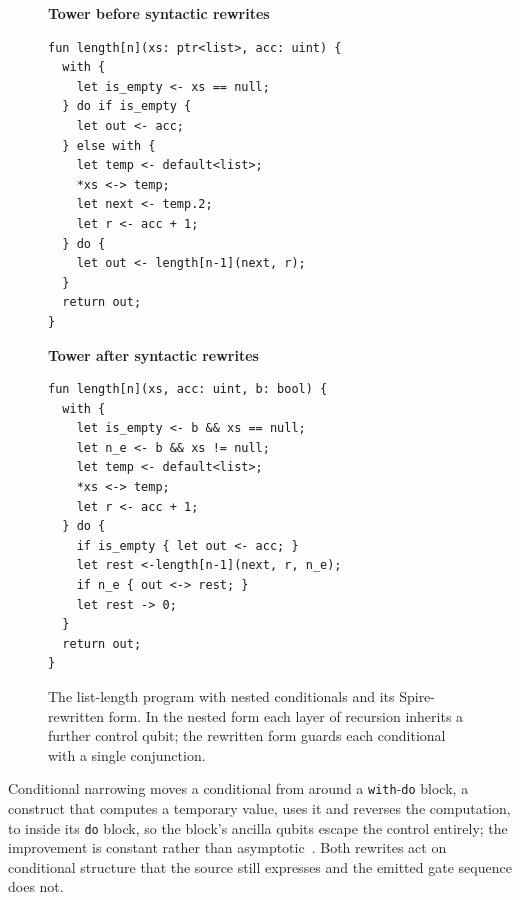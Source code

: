 \begin{figure}[htbp]
    \centering
    \begin{minipage}[t]{0.49\textwidth}
        \centering
        \textbf{Tower before syntactic rewrites~\cite{yuan2025foundationalabstractions}}
        \begin{lstlisting}[basicstyle=\ttfamily\scriptsize,
            frame=single,
            label={lst:lit_rev:compilation:length_programs:pre_opt}]
fun length[n](xs: ptr<list>, acc: uint) {
  with {
    let is_empty <- xs == null;
  } do if is_empty {
    let out <- acc;
  } else with {
    let temp <- default<list>;
    *xs <-> temp;
    let next <- temp.2;
    let r <- acc + 1;
  } do {
    let out <- length[n-1](next, r);
  }
  return out;
}
        \end{lstlisting}
    \end{minipage}
    \hfill
    \begin{minipage}[t]{0.49\textwidth}
        \centering
        \textbf{Tower after syntactic rewrites~\cite{yuan2025foundationalabstractions}}
        \begin{lstlisting}[basicstyle=\ttfamily\scriptsize,
            frame=single,
            label={lst:lit_rev:compilation:length_programs:post_opt}]
fun length[n](xs, acc: uint, b: bool) {
  with {
    let is_empty <- b && xs == null;
    let n_e <- b && xs != null;
    let temp <- default<list>;
    *xs <-> temp;
    let r <- acc + 1;
  } do {
    if is_empty { let out <- acc; }
    let rest <-length[n-1](next, r, n_e);
    if n_e { out <-> rest; }
    let rest -> 0;
  }
  return out;
}
        \end{lstlisting}
    \end{minipage}
    \caption{The list-length program with nested conditionals and its Spire-rewritten form.
    In the nested form each layer of recursion inherits a further control qubit; the rewritten form guards each conditional with a single conjunction.}
    \label{fig:lit_rev:compilation:length_programs}
\end{figure}

Conditional narrowing moves a conditional from around a \texttt{with}-\texttt{do} block, a construct that computes a temporary value, uses it and reverses the computation, to inside its \texttt{do} block, so the block's ancilla qubits escape the control entirely; the improvement is constant rather than asymptotic~\cite{yuan2025foundationalabstractions}.
Both rewrites act on conditional structure that the source still expresses and the emitted gate sequence does not.


